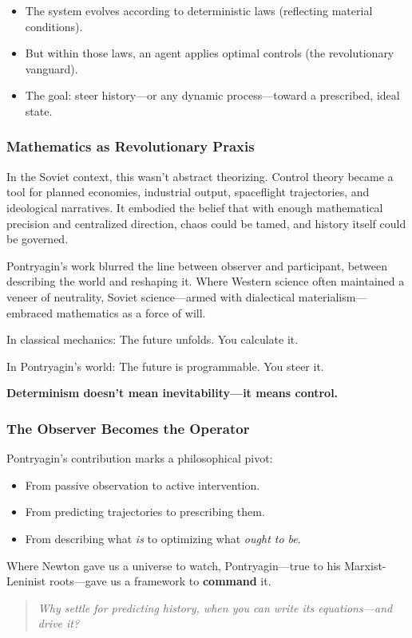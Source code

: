 \begin{itemize}
  \item The system evolves according to deterministic laws (reflecting material conditions).
  \item But within those laws, an agent applies optimal controls (the revolutionary vanguard).
  \item The goal: steer history—or any dynamic process—toward a prescribed, ideal state.
\end{itemize}

\subsubsection*{Mathematics as Revolutionary Praxis}

In the Soviet context, this wasn’t abstract theorizing. Control theory became a tool for planned economies, industrial output, spaceflight trajectories, and ideological narratives. It embodied the belief that with enough mathematical precision and centralized direction, chaos could be tamed, and history itself could be governed.

Pontryagin's work blurred the line between observer and participant, between describing the world and reshaping it. Where Western science often maintained a veneer of neutrality, Soviet science—armed with dialectical materialism—embraced mathematics as a force of will.

\begin{tcolorbox}[colback=blue!5!white, colframe=blue!50!black, title={Pontryagin’s Maximum Principle: Leninism in Mathematical Form}]
In classical mechanics:  
\quad The future unfolds. You calculate it.

In Pontryagin’s world:  
\quad The future is programmable. You steer it.

\textbf{Determinism doesn’t mean inevitability—it means control.}
\end{tcolorbox}

\subsubsection*{The Observer Becomes the Operator}

Pontryagin’s contribution marks a philosophical pivot:

\begin{itemize}
  \item From passive observation to active intervention.
  \item From predicting trajectories to prescribing them.
  \item From describing what \textit{is} to optimizing what \textit{ought to be}.
\end{itemize}

Where Newton gave us a universe to watch, Pontryagin—true to his Marxist-Leninist roots—gave us a framework to \textbf{command} it.

\begin{quote}
\emph{Why settle for predicting history, when you can write its equations—and drive it?}
\end{quote}
